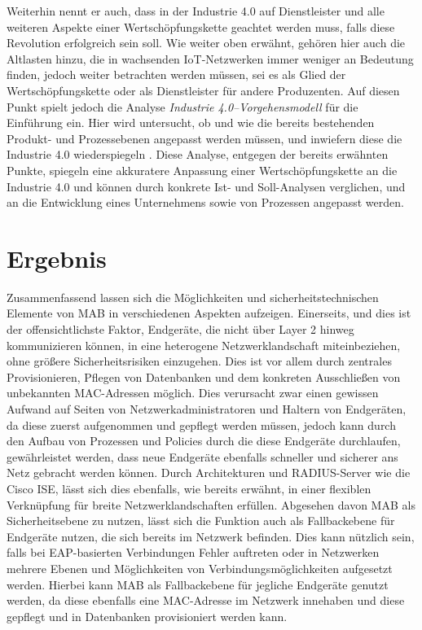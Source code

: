\documentclass[conference]{IEEEtran}
\begin{document}
Weiterhin nennt er auch, dass in der Industrie 4.0 auf Dienstleister und alle weiteren Aspekte einer Wertschöpfungskette geachtet werden muss, falls diese Revolution erfolgreich sein soll. Wie weiter oben erwähnt, gehören hier auch die Altlasten hinzu, die in wachsenden IoT-Netzwerken immer weniger an Bedeutung finden, jedoch weiter betrachten werden müssen, sei es als Glied der Wertschöpfungskette oder als Dienstleister für andere Produzenten. Auf diesen Punkt spielt jedoch die Analyse \emph{Industrie 4.0–Vorgehensmodell} für die Einführung ein. %
Hier wird untersucht, ob und wie die bereits bestehenden Produkt- und Prozessebenen angepasst werden müssen, und inwiefern diese die Industrie 4.0 wiederspiegeln \cite{lucia2016industrie}. Diese Analyse, entgegen der bereits erwähnten Punkte, spiegeln eine akkuratere Anpassung einer Wertschöpfungskette an die Industrie 4.0 und können durch konkrete Ist- und Soll-Analysen verglichen, und an die Entwicklung eines Unternehmens sowie von Prozessen angepasst werden.\\

%

\vspace{1em}
\section{Ergebnis}
Zusammenfassend lassen sich die Möglichkeiten und sicherheitstechnischen Elemente von MAB in verschiedenen Aspekten aufzeigen. Einerseits, und dies ist der offensichtlichste Faktor, Endgeräte, die nicht über Layer 2 hinweg kommunizieren können, in eine heterogene Netzwerklandschaft miteinbeziehen, ohne größere Sicherheitsrisiken einzugehen. Dies ist vor allem durch zentrales Provisionieren, Pflegen von Datenbanken und dem konkreten Ausschließen von unbekannten MAC-Adressen möglich. Dies verursacht zwar einen gewissen Aufwand auf Seiten von Netzwerkadministratoren und Haltern von Endgeräten, da diese zuerst aufgenommen und gepflegt werden müssen, jedoch kann durch den Aufbau von Prozessen und Policies durch die diese Endgeräte durchlaufen, gewährleistet werden, dass neue Endgeräte ebenfalls schneller und sicherer ans Netz gebracht werden können. Durch Architekturen und RADIUS-Server wie die Cisco ISE, lässt sich dies ebenfalls, wie bereits erwähnt, in einer flexiblen Verknüpfung für breite Netzwerklandschaften erfüllen. Abgesehen davon MAB als Sicherheitsebene zu nutzen, lässt sich die Funktion auch als Fallbackebene für Endgeräte nutzen, die sich bereits im Netzwerk befinden. Dies kann nützlich sein, falls bei EAP-basierten Verbindungen Fehler auftreten oder in Netzwerken mehrere Ebenen und Möglichkeiten von Verbindungsmöglichkeiten aufgesetzt werden. Hierbei kann MAB als Fallbackebene für jegliche Endgeräte genutzt werden, da diese ebenfalls eine MAC-Adresse im Netzwerk innehaben und diese gepflegt und in Datenbanken provisioniert werden kann.\\
\end{document}
